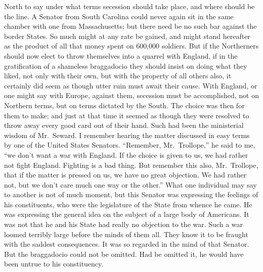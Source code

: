 North to say under what terms secession should take place, and
where should be the line.  A Senator from South Carolina could
never again sit in the same chamber with one from Massachusetts;
but there need be no such bar against the border States.  So much
might at any rate be gained, and might stand hereafter as the
product of all that money spent on 600,000 soldiers.  But if the
Northerners should now elect to throw themselves into a quarrel
with England, if in the gratification of a shameless braggadocio
they should insist on doing what they liked, not only with their
own, but with the property of all others also, it certainly did
seem as though utter ruin must await their cause.  With England, or
one might say with Europe, against them, secession must be
accomplished, not on Northern terms, but on terms dictated by the
South.  The choice was then for them to make; and just at that time
it seemed as though they were resolved to throw away every good
card out of their hand.  Such had been the ministerial wisdom of
Mr.\ Seward.  I remember hearing the matter discussed in easy terms
by one of the United States Senators.  ``Remember, Mr.\ Trollope,'' he
said to me, ``we don't want a war with England.  If the choice is
given to us, we had rather not fight England.  Fighting is a bad
thing.  But remember this also, Mr.\ Trollope, that if the matter is
pressed on us, we have no great objection.  We had rather not, but
we don't care much one way or the other.''  What one individual may
say to another is not of much moment, but this Senator was
expressing the feelings of his constituents, who were the
legislature of the State from whence he came.  He was expressing
the general idea on the subject of a large body of Americans.  It
was not that he and his State had really no objection to the war.
Such a war loomed terribly large before the minds of them all.
They know it to be fraught with the saddest consequences.  It was
so regarded in the mind of that Senator.  But the braggadocio could
not be omitted.  Had be omitted it, he would have been untrue to
his constituency.

